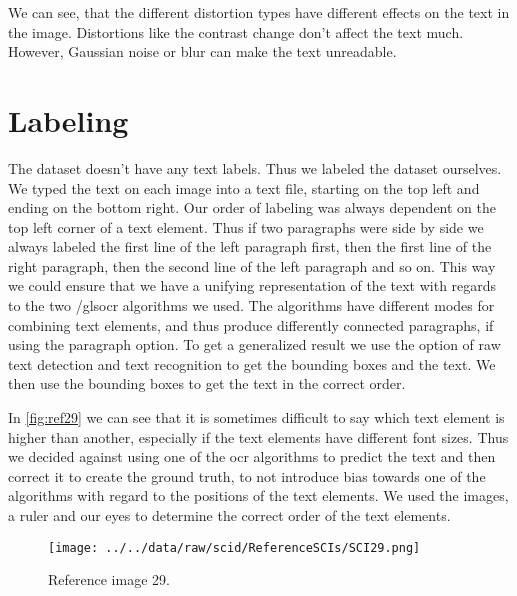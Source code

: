 We can see, that the different distortion types have different effects on the text in the image.
Distortions like the contrast change don't affect the text much.
However, Gaussian noise or blur can make the text unreadable.

\section{Labeling}
\label{sec:dataset_labeling}

The dataset doesn't have any text labels.
Thus we labeled the dataset ourselves.
We typed the text on each image into a text file, starting on the top left and ending on the bottom right.
Our order of labeling was always dependent on the top left corner of a text element.
Thus if two paragraphs were side by side we always labeled the first line of the left paragraph first, then the first line of the right paragraph, then the second line of the left paragraph and so on.
This way we could ensure that we have a unifying representation of the text with regards to the two /gls{ocr} algorithms we used.
The algorithms have different modes for combining text elements, and thus produce differently connected paragraphs, if using the paragraph option.
To get a generalized result we use the option of raw text detection and text recognition to get the bounding boxes and the text.
We then use the bounding boxes to get the text in the correct order.

In \autoref{fig:ref29} we can see that it is sometimes difficult to say which text element is higher than another, especially if the text elements have different font sizes.
Thus we decided against using one of the \gls{ocr} algorithms to predict the text and then correct it to create the ground truth, to not introduce bias towards one of the algorithms with regard to the positions of the text elements.
We used the images, a ruler and our eyes to determine the correct order of the text elements.



\begin{figure}
    \centering
    \texttt{[image: ../../data/raw/scid/ReferenceSCIs/SCI29.png]}
    \caption{Reference image 29.}
    \label{fig:ref29}
\end{figure}

